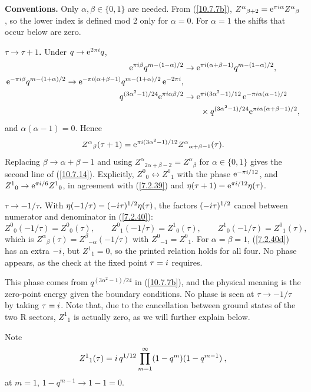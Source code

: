 	\begin{tcolorbox}[breakable]
		\begin{remark}
			\textbf{Conventions.} Only $\alpha,\beta\in\{0,1\}$ are needed. From (\ref{10.7.7b}), $Z^{\alpha}{}_{\beta+2}=\mathrm{e}^{\pi i\alpha}Z^{\alpha}{}_{\beta}$, so the lower index is defined mod 2 only for $\alpha=0$. For $\alpha=1$ the shifts that occur below are zero.

			\textbf{$\tau\to\tau+1$.} Under $q\to\mathrm{e}^{2\pi i}q$,
			\begin{align*}
				\mathrm{e}^{\pi i\beta}q^{m-(1-\alpha)/2}&\to\mathrm{e}^{\pi i(\alpha+\beta-1)}q^{m-(1-\alpha)/2},\\
				\mathrm{e}^{-\pi i\beta}q^{m-(1+\alpha)/2}\to\mathrm{e}^{-\pi i(\alpha+\beta-1)}q^{m-(1+\alpha)/2}\,\mathrm{e}^{-2\pi i},\\
				q^{(3\alpha^{2}-1)/24}\mathrm{e}^{\pi i\alpha\beta/2}&\to\mathrm{e}^{\pi i(3\alpha^{2}-1)/12}\,\mathrm{e}^{-\pi i\alpha(\alpha-1)/2}\\
				&\qquad\times q^{(3\alpha^{2}-1)/24}\mathrm{e}^{\pi i\alpha(\alpha+\beta-1)/2},
			\end{align*}
			and $\alpha(\alpha-1)=0$. Hence
			\begin{equation*}
				Z^{\alpha}{}_{\beta}(\tau+1)=\mathrm{e}^{\pi i(3\alpha^{2}-1)/12}Z^{\alpha}{}_{\alpha+\beta-1}(\tau) .
			\end{equation*}
			Replacing $\beta\to\alpha+\beta-1$ and using $Z^{\alpha}{}_{2\alpha+\beta-2}=Z^{\alpha}{}_{\beta}$ for $\alpha\in\{0,1\}$ gives the second line of (\ref{10.7.14}). Explicitly, $Z^0{}_0\leftrightarrow Z^0{}_1$ with the phase $\mathrm{e}^{-\pi i/12}$, and $Z^1{}_0\to\mathrm{e}^{\pi i/6}Z^1{}_0$, in agreement with (\ref{7.2.39}) and $\eta(\tau+1)=\mathrm{e}^{\pi i/12}\eta(\tau)$.

			\textbf{$\tau\to-1/\tau$.} With $\eta(-1/\tau)=(-i\tau)^{1/2}\eta(\tau)$, the factors $(-i\tau)^{1/2}$ cancel between numerator and denominator in (\ref{7.2.40}):
			\begin{equation*}
				Z^0{}_0(-1/\tau)=Z^0{}_0(\tau),\qquad Z^0{}_1(-1/\tau)=Z^1{}_0(\tau),\qquad Z^1{}_0(-1/\tau)=Z^0{}_1(\tau),
			\end{equation*}
			which is $Z^{\alpha}{}_{\beta}(\tau)=Z^{\beta}{}_{-\alpha}(-1/\tau)$ with $Z^0{}_{-1}=Z^0{}_1$. For $\alpha=\beta=1$, (\ref{7.2.40d}) has an extra $-i$, but $Z^1{}_1=0$, so the printed relation holds for all four. No phase appears, as the check at the fixed point $\tau=i$ requires.
		\end{remark}
	\end{tcolorbox}
	This phase comes from $q^{(3\alpha^{2}-1)/24}$ in (\ref{10.7.7b}), and the physical meaning is the zero-point energy given the boundary conditions. No phase is seen at $\tau\to-1/\tau$ by taking $\tau=i$. Note that, due to the cancellation between ground states of the two R sectors, $Z^{1}{}_{1}$ is actually zero, as we will further explain below.
	\begin{tcolorbox}[breakable]
		Note
		\[
		Z^{1}{}_{1}(\tau) = i\,q^{1/12}\prod_{m=1}^{\infty}(1-q^{m})(1-q^{m-1}) \:,
		\]
		at $m=1$, $1-q^{m-1}\to 1-1 =0$.
	\end{tcolorbox}
	
